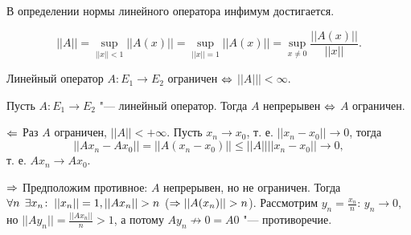 \documentclass[main]{subfiles}
\begin{document}
\begin{exercise}
  В определении нормы линейного оператора инфимум достигается.
\end{exercise}

\begin{lemma}
  \[ ||A|| = \sup_{||x|| < 1} ||A(x)|| = \sup_{||x|| = 1} ||A(x)|| =
  \sup_{x \ne 0} \frac{||A(x)||}{||x||}. \]
\end{lemma}
\begin{corollary}
  Линейный оператор \( A : E_1 \to E_2 \)
  ограничен \( \Leftrightarrow \) \( ||A||| < \infty \).
\end{corollary}

\begin{theorem}
  Пусть \( A : E_1 \to E_2 \) "---
  линейный оператор. Тогда \( A \) непрерывен \( \Leftrightarrow \)
  \( A \) ограничен.
\end{theorem}
\begin{itemproof}
  \item[\(\Leftarrow\)]
    Раз \( A \) ограничен, \( ||A|| < +\infty \).
    Пусть \( x_n \to x_0 \), т. е. \( ||x_n - x_0|| \to 0 \),
    тогда
    \[
      ||A x_n - A x_0|| = ||A(x_n - x_0)|| \le ||A|| ||x_n - x_0|| \to 0,
    \]
    т. е. \( A x_n \to A x_0 \).
  \item[$\Rightarrow$]
    Предположим противное: \( A \) непрерывен, но не ограничен.
    Тогда \( \forall {n} \; \, \exists x_n \colon \: ||x_n|| = 1, ||A x_n|| > n \)
    (\( \Rightarrow ||A(x_n)|| > n \)).
    Рассмотрим \( y_n = \frac{x_n}{n} \):
    \( y_n \to 0 \), но \( ||A y_n|| = \frac{||A x_n||}{n} > 1 \),
    а потому \( A y_n \not \to 0 = A 0 \) "--- противоречие.
\end{itemproof}
\end{document}
